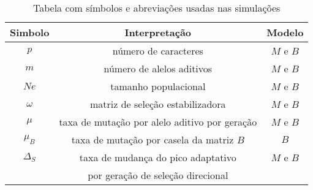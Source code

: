 \begin{table}[htbp]
    \caption[Tabela de abreviações]{Tabela com símbolos e abreviações
    usadas nas simulações}
    \label{tab:exemplo}
    \vspace{1em}
    \centering
    \begin{tabular}{c c c}
        \toprule
        Simbolo    & Interpretação & Modelo\\
        \midrule
        $p$        & número de caracteres & $M$ e $B$\\
        $m$        & número de alelos aditivos & $M$ e $B$\\
        $Ne$       & tamanho populacional & $M$ e $B$   \\
        $\omega$   & matriz de seleção estabilizadora & $M$ e $B$\\
        $\mu$      & taxa de mutação por alelo aditivo por geração & $M$ e $B$\\
        $\mu_B$    & taxa de mutação por casela da matriz $B$ & $B$\\
        $\Delta_S$ & taxa de mudança do pico adaptativo & $M$ e $B$\\
                   & por geração de seleção direcional & \\

        \bottomrule
    \end{tabular}
\end{table}
